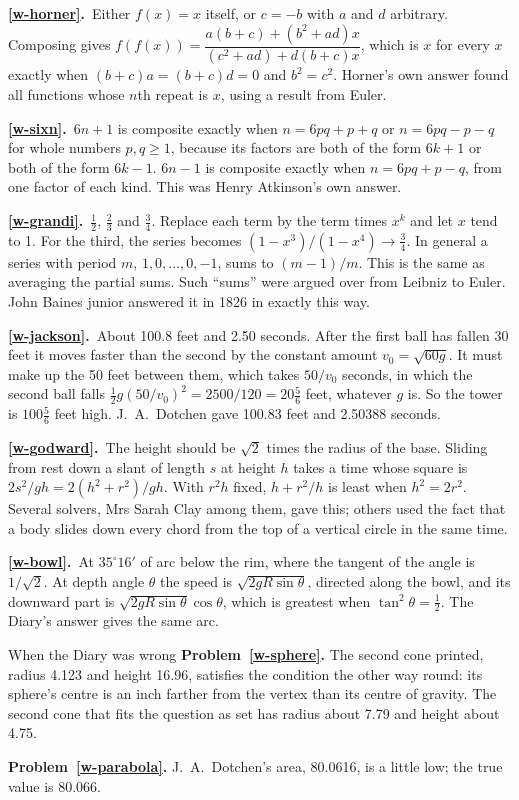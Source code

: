 \documentclass[11pt,a4paper]{article}
\newcommand{\ans}[2]{\par\smallskip\noindent\textbf{\ref{#1}.}\ #2}
\begin{document}
\ans{w-horner}{Either $f(x) = x$ itself, or $c = -b$ with $a$ and $d$ arbitrary. Composing
gives $f(f(x)) = \dfrac{a(b+c) + (b^2 + ad)x}{(c^2 + ad) + d(b+c)x}$, which is $x$ for
every $x$ exactly when $(b+c)a = (b+c)d = 0$ and $b^2 = c^2$. Horner's own answer found
all functions whose $n$th repeat is $x$, using a result from Euler.}

\ans{w-sixn}{$6n+1$ is composite exactly when $n = 6pq + p + q$ or $n = 6pq - p - q$ for
whole numbers $p, q \ge 1$, because its factors are both of the form $6k+1$ or both of the
form $6k-1$. $6n-1$ is composite exactly when $n = 6pq + p - q$, from one factor of each
kind. This was Henry Atkinson's own answer.}

\ans{w-grandi}{$\tfrac12$, $\tfrac23$ and $\tfrac34$. Replace each term by the term
times $x^k$ and let $x$ tend to 1. For the third, the series becomes
$(1 - x^3)/(1 - x^4) \to \tfrac34$. In general a series with period $m$, $1, 0, \dots,
0, -1$, sums to $(m-1)/m$. This is the same as averaging the partial sums. Such
``sums'' were argued over from Leibniz to Euler. John Baines junior answered it in 1826 in exactly this way.}

\ans{w-jackson}{About 100.8 feet and 2.50 seconds. After the first ball has fallen 30
feet it moves faster than the second by the constant amount $v_0 = \sqrt{60g}$. It must
make up the 50 feet between them, which takes $50/v_0$ seconds, in which the second ball
falls $\tfrac12g(50/v_0)^2 = 2500/120 = 20\tfrac56$ feet, whatever $g$ is. So the tower is
$100\tfrac56$ feet high. J.~A.~Dotchen gave 100.83 feet and 2.50388 seconds.}

\ans{w-godward}{The height should be $\sqrt2$ times the radius of the base. Sliding from
rest down a slant of length $s$ at height $h$ takes a time whose square is
$2s^2/gh = 2(h^2 + r^2)/gh$. With $r^2h$ fixed, $h + r^2/h$ is least when $h^2 = 2r^2$.
Several solvers, Mrs Sarah Clay among them, gave this; others used the fact that a body
slides down every chord from the top of a vertical circle in the same time.}

\ans{w-bowl}{At $35^\circ16'$ of arc below the rim, where the tangent of the angle is
$1/\sqrt2$. At depth angle $\theta$ the speed is $\sqrt{2gR\sin\theta}$, directed along the
bowl, and its downward part is $\sqrt{2gR\sin\theta}\cos\theta$, which is greatest when
$\tan^2\theta = \tfrac12$. The Diary's answer gives the same arc.}

\begin{diarynote}{When the Diary was wrong}
\textbf{Problem~\ref{w-sphere}.} The second cone printed, radius 4.123 and height 16.96,
satisfies the condition the other way round: its sphere's centre is an inch farther from
the vertex than its centre of gravity. The second cone that fits the question as set has
radius about 7.79 and height about 4.75.

\textbf{Problem~\ref{w-parabola}.} J.~A.~Dotchen's area, 80.0616, is a little low; the true
value is 80.066.
\end{diarynote}
\end{document}
